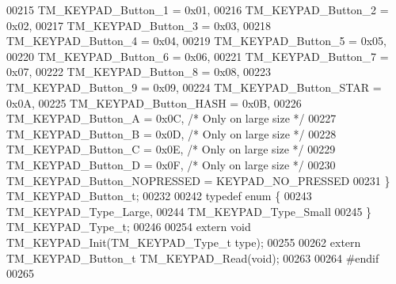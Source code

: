 \begin{DoxyCode}
00215     TM\_KEYPAD\_Button\_1 = 0x01,
00216     TM\_KEYPAD\_Button\_2 = 0x02,
00217     TM\_KEYPAD\_Button\_3 = 0x03,
00218     TM\_KEYPAD\_Button\_4 = 0x04,
00219     TM\_KEYPAD\_Button\_5 = 0x05,
00220     TM\_KEYPAD\_Button\_6 = 0x06,
00221     TM\_KEYPAD\_Button\_7 = 0x07,
00222     TM\_KEYPAD\_Button\_8 = 0x08,
00223     TM\_KEYPAD\_Button\_9 = 0x09,
00224     TM\_KEYPAD\_Button\_STAR = 0x0A,
00225     TM\_KEYPAD\_Button\_HASH = 0x0B,
00226     TM\_KEYPAD\_Button\_A = 0x0C,  \textcolor{comment}{/* Only on large size */}
00227     TM\_KEYPAD\_Button\_B = 0x0D,  \textcolor{comment}{/* Only on large size */}
00228     TM\_KEYPAD\_Button\_C = 0x0E,  \textcolor{comment}{/* Only on large size */}
00229     TM\_KEYPAD\_Button\_D = 0x0F,  \textcolor{comment}{/* Only on large size */}
00230     TM\_KEYPAD\_Button\_NOPRESSED = KEYPAD\_NO\_PRESSED
00231 \} TM\_KEYPAD\_Button\_t;
00232 
00242 \textcolor{keyword}{typedef} \textcolor{keyword}{enum} \{
00243     TM\_KEYPAD\_Type\_Large,
00244     TM\_KEYPAD\_Type\_Small
00245 \} TM\_KEYPAD\_Type\_t;
00246 
00254 \textcolor{keyword}{extern} \textcolor{keywordtype}{void} TM\_KEYPAD\_Init(TM\_KEYPAD\_Type\_t type);
00255 
00262 \textcolor{keyword}{extern} TM\_KEYPAD\_Button\_t TM\_KEYPAD\_Read(\textcolor{keywordtype}{void});
00263 
00264 \textcolor{preprocessor}{#endif}
00265 
\end{DoxyCode}
